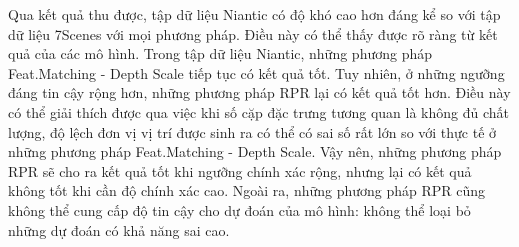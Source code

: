 Qua kết quả thu được, tập dữ liệu Niantic có độ khó cao hơn đáng kể so với tập dữ liệu 7Scenes với mọi phương pháp. Điều này có thể thấy được rõ ràng từ kết quả của các mô hình. Trong tập dữ liệu Niantic, những phương pháp Feat.Matching - Depth Scale tiếp tục có kết quả tốt. Tuy nhiên, ở những ngưỡng đáng tin cậy rộng hơn, những phương pháp RPR lại có kết quả tốt hơn. Điều này có thể giải thích được qua việc khi số cặp đặc trưng tương quan là không đủ chất lượng, độ lệch đơn vị vị trí được sinh ra có thể có sai số rất lớn so với thực tế ở những phương pháp Feat.Matching - Depth Scale. Vậy nên, những phương pháp RPR sẽ cho ra kết quả tốt khi ngưỡng chính xác rộng, nhưng lại có kết quả không tốt khi cần độ chính xác cao. Ngoài ra, những phương pháp RPR cũng không thể cung cấp độ tin cậy cho dự đoán của mô hình: không thể loại bỏ những dự đoán có khả năng sai cao.
